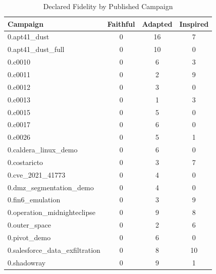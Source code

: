 \begin{table}[htbp]
\centering
\caption{Declared Fidelity by Published Campaign}
\label{tab:fidelity}
\begin{tabular}{lccc}
\toprule
Campaign & Faithful & Adapted & Inspired \\
\midrule
0.apt41_dust & 0 & 16 & 7 \\
0.apt41_dust_full & 0 & 10 & 0 \\
0.c0010 & 0 & 6 & 3 \\
0.c0011 & 0 & 2 & 9 \\
0.c0012 & 0 & 3 & 0 \\
0.c0013 & 0 & 1 & 3 \\
0.c0015 & 0 & 5 & 0 \\
0.c0017 & 0 & 6 & 0 \\
0.c0026 & 0 & 5 & 1 \\
0.caldera_linux_demo & 0 & 6 & 0 \\
0.costaricto & 0 & 3 & 7 \\
0.cve_2021_41773 & 0 & 4 & 0 \\
0.dmz_segmentation_demo & 0 & 4 & 0 \\
0.fin6_emulation & 0 & 3 & 9 \\
0.operation_midnighteclipse & 0 & 9 & 8 \\
0.outer_space & 0 & 2 & 6 \\
0.pivot_demo & 0 & 6 & 0 \\
0.salesforce_data_exfiltration & 0 & 8 & 10 \\
0.shadowray & 0 & 9 & 1 \\
\bottomrule
\end{tabular}
\end{table}
